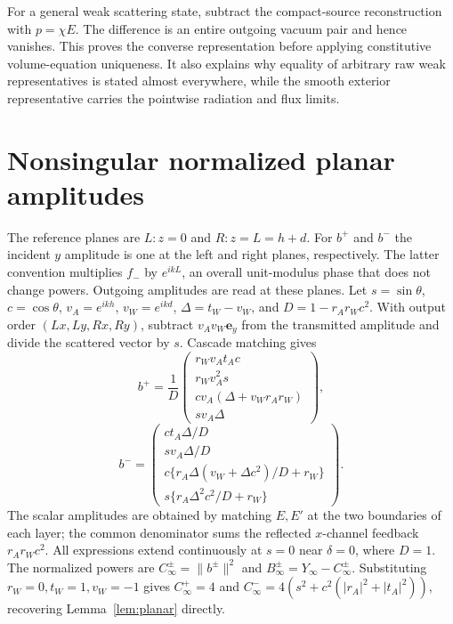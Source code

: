 \documentclass[11pt]{article}
\newcommand{\ey}{\mathbf e_y}
\newcommand{\norm}[1]{\lVert #1\rVert}
\newcommand{\abs}[1]{\lvert #1\rvert}
\begin{document}
For a general weak scattering state, subtract the compact-source reconstruction with $p=\chi E$. The difference is an entire outgoing vacuum pair and hence vanishes. This proves the converse representation before applying constitutive volume-equation uniqueness. It also explains why equality of arbitrary raw weak representatives is stated almost everywhere, while the smooth exterior representative carries the pointwise radiation and flux limits.

\section{Nonsingular normalized planar amplitudes}\label{app:amplitudes}
The reference planes are $L:z=0$ and $R:z=L=h+d$. For $b^+$ and $b^-$ the incident $y$ amplitude is one at the left and right planes, respectively. The latter convention multiplies $f_-$ by $e^{ikL}$, an overall unit-modulus phase that does not change powers. Outgoing amplitudes are read at these planes. Let $s=\sin\theta$, $c=\cos\theta$, $v_A=e^{ikh}$, $v_W=e^{ikd}$, $\Delta=t_W-v_W$, and $D=1-r_Ar_Wc^2$. With output order $(Lx,Ly,Rx,Ry)$, subtract $v_Av_W\ey$ from the transmitted amplitude and divide the scattered vector by $s$. Cascade matching gives
\begin{equation}\label{eq:amplitudes-plus}
 b^+=\frac1D\begin{pmatrix}
 r_Wv_At_Ac\\r_Wv_A^2s\\cv_A(\Delta+v_Wr_Ar_W)\\sv_A\Delta
 \end{pmatrix},
\end{equation}
\begin{equation}\label{eq:amplitudes-minus}
 b^-=\begin{pmatrix}
 ct_A\Delta/D\\sv_A\Delta/D\\
 c\{r_A\Delta(v_W+\Delta c^2)/D+r_W\}\\
 s\{r_A\Delta^2c^2/D+r_W\}
 \end{pmatrix}.
\end{equation}
The scalar amplitudes are obtained by matching $E,E'$ at the two boundaries of each layer; the common denominator sums the reflected $x$-channel feedback $r_Ar_Wc^2$. All expressions extend continuously at $s=0$ near $\delta=0$, where $D=1$. The normalized powers are $C_\infty^\pm=\norm{b^\pm}^2$ and $B_\infty^\pm=Y_\infty-C_\infty^\pm$. Substituting $r_W=0,t_W=1,v_W=-1$ gives $C_\infty^+=4$ and $C_\infty^-=4(s^2+c^2(\abs{r_A}^2+\abs{t_A}^2))$, recovering Lemma~\ref{lem:planar} directly.
\end{document}
